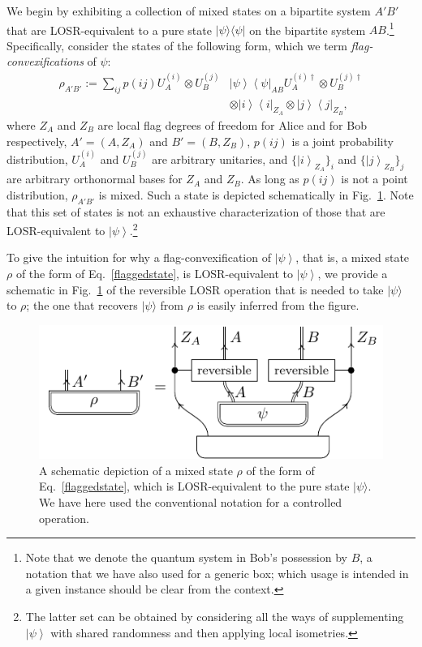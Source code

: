 \documentclass[12pt]{article}
\newcommand{\ket}[1]{\left| #1 \right>}
\newcommand{\bra}[1]{\left< #1 \right|}
\theoremstyle{plain}
\theoremstyle{definition}
\begin{document}
\begin{appendices}
We begin by exhibiting  a collection of mixed states on a bipartite system $A'B'$ that are LOSR-equivalent to a pure state $|\psi\rangle \langle \psi|$ on the bipartite system $AB$.\footnote{Note that we denote the quantum system in Bob's possession by $B$, a notation that we have also used for a generic box; which usage is intended in a given instance should be clear from the context. } Specifically, consider the states of the following form, which we term {\em flag-convexifications} of $\psi$:
\begin{align}\label{flaggedstate}
\rho_{A'B'} := \sum_{ij} p(i j) U_A^{(i)} \otimes U_B^{(j)} & \ket{\psi} \! \bra{\psi}_{AB} U_A^{ (i)\dagger} \otimes U_B^{ (j)\dagger} 
\nonumber \\ &\otimes \ket{i}\! \bra{i}_{Z_A} \otimes \ket{j}\! \bra{j}_{Z_B},
\end{align}
where $Z_A$ and $Z_B$ are local flag degrees of freedom for Alice and for Bob respectively, $A'=(A,Z_A)$ and $B'=(B,Z_B)$, $p(ij)$ is a joint probability distribution, $U_A^{(i)}$ and $U_B^{(j)}$ are arbitrary unitaries, and $\{ \ket{i}_{Z_A}\}_i$ and $\{ \ket{j}_{Z_B}\}_j$ are arbitrary orthonormal bases for $Z_A$ and $Z_B$.     As long as $p(ij)$ is not a point distribution, 
$\rho_{A'B'}$ is mixed.  Such a state is depicted schematically in Fig.~\ref{NonextremalStates}.
Note that this set of states is not an exhaustive characterization of those that are LOSR-equivalent to $\ket{\psi}$.\footnote{The latter set can be obtained by considering all the ways of supplementing $\ket{\psi}$ with shared randomness and then applying local isometries.}
 


To give the intuition for why a flag-convexification of $\ket{\psi}$, that is, a mixed state $\rho$ of the form of Eq.~\eqref{flaggedstate}, is LOSR-equivalent to $\ket{\psi}$, we provide a schematic in Fig.~\ref{NonextremalStates} of the reversible LOSR operation that is needed to take $|\psi\rangle$ to $\rho$; the one that recovers $|\psi\rangle$ from $\rho$ is easily inferred from the figure.

\begin{figure}[h!]
\centering
    \includegraphics[scale=1]{fig_losr_equiv_control_state.pdf}
    \caption{A schematic depiction of a mixed state $\rho$ of the form of Eq.~\eqref{flaggedstate}, which is LOSR-equivalent to the pure state $|\psi\rangle$.
We have here used the conventional notation for a controlled operation.
    }
    \label{NonextremalStates}
\end{figure}



\end{appendices}
\end{document}
